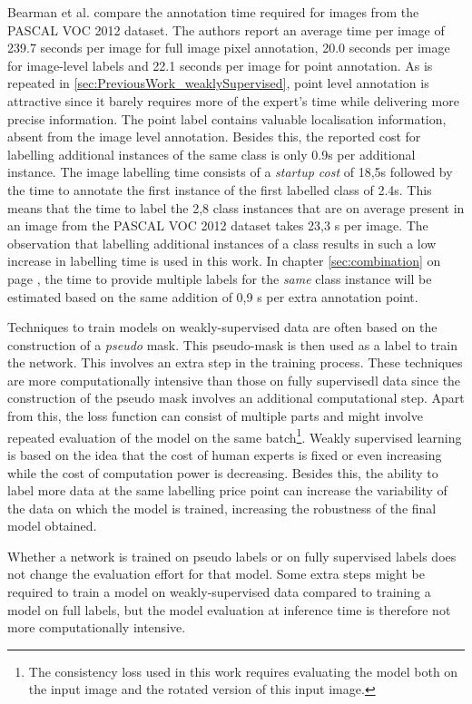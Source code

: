 \par{
    Bearman et al.\cite{Bearman2015} compare the annotation time required for images from the PASCAL VOC 2012 dataset.
    The authors report an average time per image of 239.7 seconds per image for full image pixel annotation, 20.0 seconds per image for image-level labels and 22.1 seconds per image for point annotation.
    As is repeated in \ref{sec:PreviousWork_weaklySupervised}, point level annotation is attractive since it barely requires more of the expert's time while delivering more precise information.
    The point label contains valuable localisation information, absent from the image level annotation.
    Besides this, the reported cost for labelling additional instances of the same class is only 0.9s per additional instance.
    The image labelling time consists of a \textit{startup cost} of 18,5s followed by the time to annotate the first instance of the first labelled class of 2.4s.
    This means that the time to label the 2,8 class instances that are on average present in an image from the PASCAL VOC 2012 dataset takes 23,3 s per image.
    The observation that labelling additional instances of a class results in such a low increase in labelling time is used in this work.
    In chapter \ref{sec:combination} on page \pageref{sec:combination}, the time to provide multiple labels for the \textit{same} class instance will be estimated based on the same addition of 0,9 s per extra annotation point.
}
\par{
    Techniques to train models on weakly-supervised data are often based on the construction of a \textit{pseudo} mask.
    This pseudo-mask is then used as a label to train the network.
    This involves an extra step in the training process.
    These techniques are more computationally intensive than those on fully \Gls{supervisedl} data since the construction of the pseudo mask involves an additional computational step.
    Apart from this, the loss function can consist of multiple parts and might involve repeated evaluation of the model on the same batch\footnote{
        The consistency loss used in this work requires evaluating the model both on the input image and the rotated version of this input image.
        }. 
    Weakly supervised learning is based on the idea that the cost of human experts is fixed or even increasing while the cost of computation power is decreasing.
    Besides this, the ability to label more data at the same labelling price point can increase the variability of the data on which the model is trained, increasing the robustness of the final model obtained.
}
\par{
    Whether a network is trained on pseudo labels or on fully supervised labels does not change the evaluation effort for that model.
    Some extra steps might be required to train a model on weakly-supervised data compared to training a model on full labels, 
    but the model evaluation at inference time is therefore not more computationally intensive.
}
